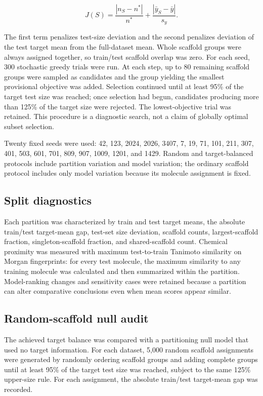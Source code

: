 \begin{equation}
J(S)=\frac{|n_S-n^{*}|}{n^{*}}+\frac{|\bar{y}_S-\bar{y}|}{s_y}.
\label{eq:balanced-objective}
\end{equation}

The first term penalizes test-size deviation and the second penalizes deviation of the test target mean from the full-dataset mean. Whole scaffold groups were always assigned together, so train/test scaffold overlap was zero. For each seed, 300 stochastic greedy trials were run. At each step, up to 80 remaining scaffold groups were sampled as candidates and the group yielding the smallest provisional objective was added. Selection continued until at least 95\% of the target test size was reached; once selection had begun, candidates producing more than 125\% of the target size were rejected. The lowest-objective trial was retained. This procedure is a diagnostic search, not a claim of globally optimal subset selection.

Twenty fixed seeds were used: 42, 123, 2024, 2026, 3407, 7, 19, 71, 101, 211, 307, 401, 503, 601, 701, 809, 907, 1009, 1201, and 1429. Random and target-balanced protocols include partition variation and model variation; the ordinary scaffold protocol includes only model variation because its molecule assignment is fixed.

\subsection{Split diagnostics}

Each partition was characterized by train and test target means, the absolute train/test target-mean gap, test-set size deviation, scaffold counts, largest-scaffold fraction, singleton-scaffold fraction, and shared-scaffold count. Chemical proximity was measured with maximum test-to-train Tanimoto similarity on Morgan fingerprints: for every test molecule, the maximum similarity to any training molecule was calculated and then summarized within the partition. Model-ranking changes and sensitivity cases were retained because a partition can alter comparative conclusions even when mean scores appear similar.

\subsection{Random-scaffold null audit}

The achieved target balance was compared with a partitioning null model that used no target information. For each dataset, 5,000 random scaffold assignments were generated by randomly ordering scaffold groups and adding complete groups until at least 95\% of the target test size was reached, subject to the same 125\% upper-size rule. For each assignment, the absolute train/test target-mean gap was recorded.

